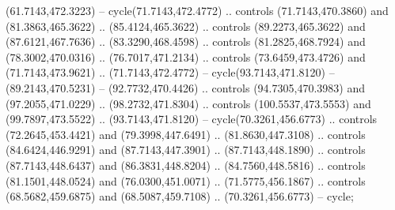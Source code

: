 \begin{scope}[shift={(58.28571,-442.36218)}]
    (61.7143,472.3223) -- cycle(71.7143,472.4772) .. controls (71.7143,470.3860)
    and (81.3863,465.3622) .. (85.4124,465.3622) .. controls (89.2273,465.3622)
    and (87.6121,467.7636) .. (83.3290,468.4598) .. controls (81.2825,468.7924)
    and (78.3002,470.0316) .. (76.7017,471.2134) .. controls (73.6459,473.4726)
    and (71.7143,473.9621) .. (71.7143,472.4772) -- cycle(93.7143,471.8120) --
    (89.2143,470.5231) -- (92.7732,470.4426) .. controls (94.7305,470.3983) and
    (97.2055,471.0229) .. (98.2732,471.8304) .. controls (100.5537,473.5553) and
    (99.7897,473.5522) .. (93.7143,471.8120) -- cycle(70.3261,456.6773) ..
    controls (72.2645,453.4421) and (79.3998,447.6491) .. (81.8630,447.3108) ..
    controls (84.6424,446.9291) and (87.7143,447.3901) .. (87.7143,448.1890) ..
    controls (87.7143,448.6437) and (86.3831,448.8204) .. (84.7560,448.5816) ..
    controls (81.1501,448.0524) and (76.0300,451.0071) .. (71.5775,456.1867) ..
    controls (68.5682,459.6875) and (68.5087,459.7108) .. (70.3261,456.6773) --
    cycle;
\end{scope}

